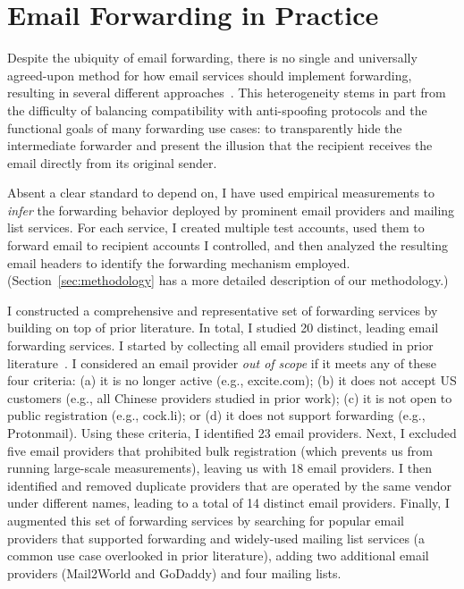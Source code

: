 \section{Email Forwarding in Practice}
\label{sec:measure_forwarding_mechs_and_arc}

Despite the ubiquity of email forwarding, there is no single and
universally agreed-upon method for how email services should implement
forwarding, resulting in several different approaches~\cite{Emailfor34:online}.  This
heterogeneity stems in part from the difficulty of balancing
compatibility with anti-spoofing protocols and the functional goals of
many forwarding use cases: to transparently hide the intermediate
forwarder and present the illusion that the recipient receives the
email directly from its original sender.

Absent a clear standard to depend on, I have used empirical
measurements to \emph{infer} the forwarding behavior deployed by
prominent email providers and mailing list services.  For each
service, I created multiple test accounts, used them to forward email
to recipient accounts I controlled, and then analyzed the resulting
email headers to identify the forwarding mechanism employed.
(Section~\ref{sec:methodology} has a more detailed description of our
methodology.)

I constructed a comprehensive and representative set of forwarding services by building on top of prior literature.
In total, I studied 20 distinct, leading email forwarding services.
I started by collecting all email providers studied in prior literature~\cite{chen2020composition,shen2020weak,hu_end--end_nodate,wang2022revisiting}.
I considered an email provider \emph{out of scope} if it meets any of these four criteria: (a) it is no longer active (e.g., excite.com); (b) it does not accept US customers (e.g., all Chinese providers studied in prior work);  (c) it is not open to public registration (e.g., cock.li); or (d) it does not support forwarding (e.g., Protonmail).
Using these criteria, I identified 23 email providers.
Next, I excluded five email providers that prohibited bulk registration (which prevents us from running large-scale measurements), leaving us with 18 email providers.
I then identified and removed duplicate providers that are operated by the same vendor under different names, leading to a total of 14 distinct email providers.
Finally, I augmented this set of forwarding services by searching for popular email providers that supported forwarding and widely-used mailing list services (a common use case overlooked in prior literature), adding two additional email providers (Mail2World and GoDaddy) and four mailing lists.

